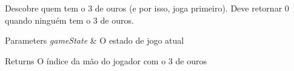 Descobre quem tem o 3 de ouros (e por isso, joga primeiro). Deve retornar 0 quando ninguém tem o 3 de ouros. 


\begin{DoxyParams}{Parameters}
{\em game\+State} & O estado de jogo atual \\
\hline
\end{DoxyParams}
\begin{DoxyReturn}{Returns}
O índice da mão do jogador com o 3 de ouros 
\end{DoxyReturn}
